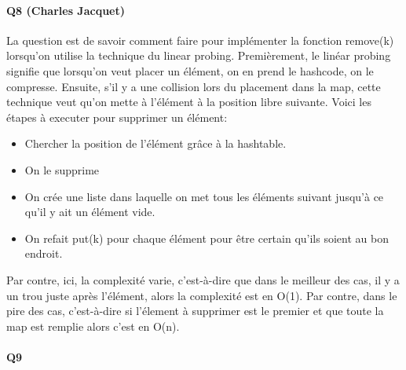 \documentclass[a4paper]{article}
\begin{document}
\paragraph{Q8 (Charles Jacquet)}
La question est de savoir comment faire pour implémenter la fonction remove(k) lorsqu'on utilise la technique du linear probing. Premièrement, le linéar probing signifie que lorsqu'on veut placer un élément, on en prend le hashcode, on le compresse. Ensuite, s'il y a une collision lors du placement dans la map, cette technique veut qu'on mette à l'élément à la position libre suivante. Voici les étapes à executer pour supprimer un élément:
\begin{itemize}
\item Chercher la position de l'élément grâce à la hashtable.
\item On le supprime
\item On crée une liste dans laquelle on met tous les éléments suivant jusqu'à ce qu'il y ait un élément vide.
\item On refait put(k) pour chaque élément pour être certain qu'ils soient au bon endroit.
\end{itemize}

Par contre, ici, la complexité varie, c'est-à-dire que dans le meilleur des cas, il y a un trou juste après l'élément, alors la complexité est en O(1). Par contre, dans le pire des cas, c'est-à-dire si l'élement à supprimer est le premier et que toute la map est remplie alors c'est en O(n).

\paragraph{Q9}
\end{document}
